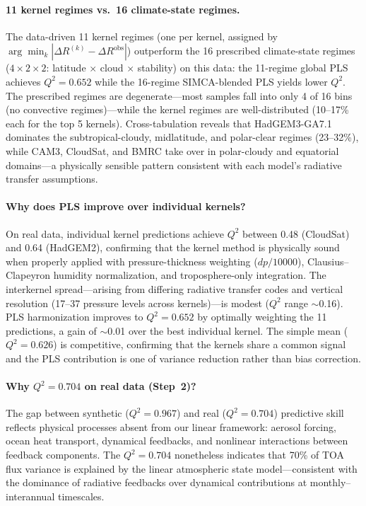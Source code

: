 \documentclass[11pt]{article}
\newcommand{\Qsq}{Q^{2}}
\begin{document}
\paragraph{11 kernel regimes vs.\ 16 climate-state regimes.}
The data-driven 11 kernel regimes (one per kernel, assigned by
$\arg\min_k |{\Delta R^{(k)} - \Delta R^\text{obs}}|$)
outperform the 16 prescribed climate-state regimes
($4 \times 2 \times 2$: latitude $\times$ cloud $\times$
stability) on this data: the 11-regime global PLS achieves
$\Qsq = 0.652$ while the 16-regime SIMCA-blended PLS yields
lower $\Qsq$. The prescribed regimes are degenerate---most
samples fall into only 4 of 16 bins (no convective
regimes)---while the kernel regimes are well-distributed
(10--17\% each for the top 5 kernels). Cross-tabulation reveals
that HadGEM3-GA7.1 dominates the subtropical-cloudy,
midlatitude, and polar-clear regimes (23--32\%), while CAM3,
CloudSat, and BMRC take over in polar-cloudy and equatorial
domains---a physically sensible pattern consistent with each
model's radiative transfer assumptions.

\paragraph{Why does PLS improve over individual kernels?}
On real data, individual kernel predictions achieve $\Qsq$
between 0.48 (CloudSat) and 0.64 (HadGEM2), confirming that the
kernel method is physically sound when properly applied with
pressure-thickness weighting ($dp/10000$), Clausius--Clapeyron
humidity normalization, and troposphere-only integration.
The interkernel spread---arising from differing radiative transfer
codes and vertical resolution (17--37 pressure levels across
kernels)---is modest ($\Qsq$ range $\sim$0.16). PLS
harmonization improves to $\Qsq = 0.652$ by optimally weighting
the 11 predictions, a gain of $\sim$0.01 over the best
individual kernel. The simple mean ($\Qsq = 0.626$) is
competitive, confirming that the kernels share a common signal
and the PLS contribution is one of variance reduction rather
than bias correction.

\paragraph{Why $\Qsq = 0.704$ on real data (Step~2)?}
The gap between synthetic ($\Qsq = 0.967$) and real ($\Qsq =
0.704$) predictive skill reflects physical processes absent from
our linear framework: aerosol forcing, ocean heat transport,
dynamical feedbacks, and nonlinear interactions between feedback
components. The $\Qsq = 0.704$ nonetheless indicates that 70\% of
TOA flux variance is explained by the linear atmospheric state
model---consistent with the dominance of radiative feedbacks over
dynamical contributions at monthly--interannual timescales.
\end{document}
